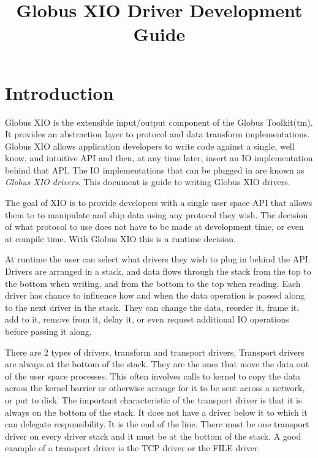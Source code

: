 \documentclass[11pt]{article}
\title{Globus XIO Driver Development Guide}
\begin{document}
\maketitle

\section{Introduction}
Globus XIO is the extensible input/output component of the Globus Toolkit(tm).
It provides an abstraction layer to protocol and data transform
implementations.  Globus XIO allows application developers to write
code against a single, well know, and intuitive API and then, at any time later,
insert an IO implementation behind that API.  The IO implementations
that can be plugged in are known as \emph{Globus XIO drivers}.  
This document is guide to writing Globus XIO drivers.

The goal of XIO is to provide developers with a single user space API
that allows them to to manipulate and ship data using any protocol they
wish.  The decision of what protocol to use does not have to be made
at development time, or even at compile time.  With Globus XIO this is
a runtime decision.  

At runtime the user can select what drivers they wish to plug in behind the
API.  Drivers are arranged in a stack, and data flows through the stack
from the top to the bottom when writing, and from the bottom to the
top when reading.  Each driver has chance to influence how and when
the data operation is passed along to the next driver in the stack.  
They can change the data, reorder it, frame it, add to it, remove from it,
delay it, or even request additional IO operations before passing it along.

There are 2 types of drivers, transform and transport drivers,
Transport drivers are always at the bottom of the stack.  They are 
the ones that move the data out of the user space processes.  This
often involves calls to kernel to copy the data across the kernel
barrier or otherwise arrange for it to be sent across a network, or
put to disk.  The important characteristic of the transport driver is
that it is always on the bottom of the stack.  It does not have
a driver below it to which it can delegate responsibility.  It is
the end of the line.  There must be one transport driver on every driver
stack and it must be at the bottom of the stack.  A good example of
a transport driver is the TCP driver or the FILE driver.
\end{document}

